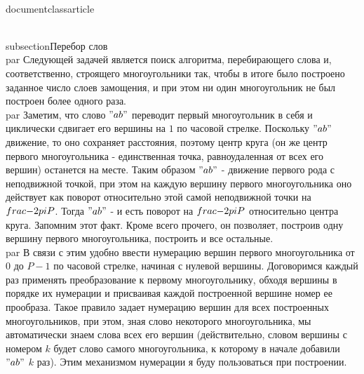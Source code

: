 \\documentclass{article}
\begin{document}
\\subsection{Перебор слов}
\\par Следующей задачей является поиск алгоритма, перебирающего слова и, соответственно, строящего многоугольники так, чтобы в итоге было построено заданное число слоев замощения, и при этом ни один многоугольник не был построен более одного раза. 
\\par Заметим, что слово $"ab"$ переводит первый многоугольник в себя и циклически сдвигает его вершины на $1$ по часовой стрелке. Поскольку $"ab"$ движение, то оно сохраняет расстояния, поэтому центр круга (он же центр первого многоугольника - единственная точка, равноудаленная от всех его вершин) останется на месте. Таким образом $"ab"$ - движение первого рода с неподвижной точкой, при этом на каждую вершину первого многоугольника оно действует как поворот относительно этой самой неподвижной точки на $\\frac{-2\\pi}{P}$. Тогда $"ab"$ - и есть поворот на $\\frac{-2\\pi}{P}$ относительно центра круга. Запомним этот факт. Кроме всего прочего, он позволяет, построив одну вершину первого многоугольника, построить и все остальные.
\\par В связи с этим удобно ввести нумерацию вершин первого многоугольника от $0$ до $P - 1$ по часовой стрелке, начиная с нулевой вершины. Договоримся каждый раз применять преобразование к первому многоугольнику, обходя вершины в порядке их нумерации и присваивая каждой построенной вершине номер ее прообраза. Такое правило задает нумерацию вершин для всех построенных многоугольников, при этом, зная слово некоторого многоугольника, мы автоматически знаем слова всех его вершин (действительно, словом вершины с номером $k$ будет слово самого многоугольника, к которому в начале добавили $"ab"$ $k$ раз). Этим механизмом нумерации я буду пользоваться при построении.
\end{document}
